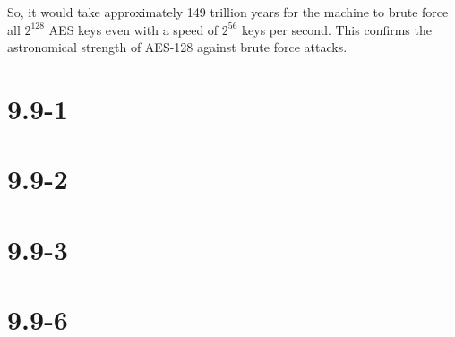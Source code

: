 \documentclass[12pt]{article}
\begin{document}
So, it would take approximately 149 trillion years for the machine to brute force all \( 2^{128} \) AES keys even with a speed of \( 2^{56} \) keys per second. This confirms the astronomical strength of AES-128 against brute force attacks.
\newpage







\section*{9.9-1}

\newpage





\section*{9.9-2}

\newpage





\section*{9.9-3}

\newpage




\section*{9.9-6}

\newpage
\end{document}
